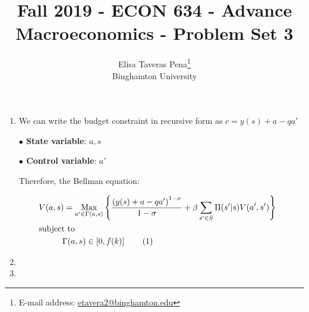 \documentclass[12pt]{article}%
\newcommand\tab[1][1cm]{\hspace*{#1}}
\DeclareMathOperator*{\Max}{Max}
\newcommand\numberthis{\addtocounter{equation}{1}\tag{\theequation}}
\begin{document}
\title{Fall 2019 - ECON 634 - Advance Macroeconomics - Problem Set 3}
\author{Elisa Taveras Pena\footnote{E-mail address: \href{mailto:etavera2@binghamton.edu}{etavera2@binghamton.edu}  }\\
Binghamton University}
\maketitle

\sloppy%

\onehalfspacing

\begin{enumerate}
	\item	We can write the budget constraint  in recursive form as  $c=y(s)+a -qa'$ 
	
	\tab \textbf{ $\bullet$ State variable}: $a,s$ 
	
	\tab \textbf{ $\bullet$ Control variable}: $a'$
	
	
	
	Therefore, the Bellman equation:
	
	\begin{align*}
	&V(a,s)=\Max_{a'\in \Gamma(a,s)} \left\lbrace \frac{\left( y(s)+a -qa'\right) ^{1-\sigma}}{1-\sigma}+ \beta \sum_{s' \in S} \Pi(s'|s)V(a',s')\right\rbrace 
	& \notag \\
	&\text{subject to} \notag \\
	& \tab \Gamma(a,s) \in \left[ 0,f(k)\right] \numberthis\\
	\end{align*} 
	
	\item
	\item  
	
\end{enumerate}

\strut

\onehalfspacing
\end{document}
